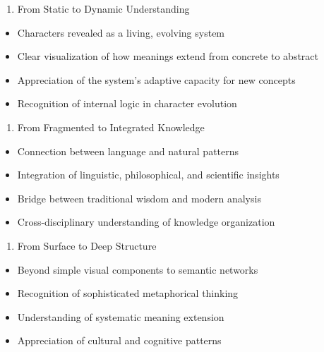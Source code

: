 \begin{enumerate}
\def\labelenumi{\arabic{enumi}.}
\setcounter{enumi}{1}
\tightlist
\item
  From Static to Dynamic Understanding
\end{enumerate}

\begin{itemize}
\tightlist
\item
  Characters revealed as a living, evolving system
\item
  Clear visualization of how meanings extend from concrete to abstract
\item
  Appreciation of the system's adaptive capacity for new concepts
\item
  Recognition of internal logic in character evolution
\end{itemize}

\begin{enumerate}
\def\labelenumi{\arabic{enumi}.}
\setcounter{enumi}{2}
\tightlist
\item
  From Fragmented to Integrated Knowledge
\end{enumerate}

\begin{itemize}
\tightlist
\item
  Connection between language and natural patterns
\item
  Integration of linguistic, philosophical, and scientific insights
\item
  Bridge between traditional wisdom and modern analysis
\item
  Cross-disciplinary understanding of knowledge organization
\end{itemize}

\begin{enumerate}
\def\labelenumi{\arabic{enumi}.}
\setcounter{enumi}{3}
\tightlist
\item
  From Surface to Deep Structure
\end{enumerate}

\begin{itemize}
\tightlist
\item
  Beyond simple visual components to semantic networks
\item
  Recognition of sophisticated metaphorical thinking
\item
  Understanding of systematic meaning extension
\item
  Appreciation of cultural and cognitive patterns
\end{itemize}

